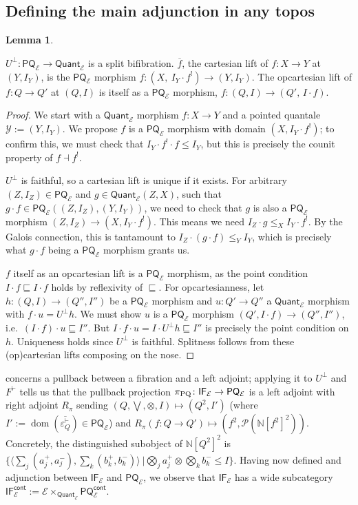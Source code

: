 \documentclass{article}
\makeatletter
\newcommand{\allproofs}{} %
\newif\ifproofsinappendix
\newcommand{\lemmawithproof}[3]{%
  \begin{lemma}\label{#1}
    #2  
    \ifproofsinappendix \hyperref[xxx#1]{(Proof)} \fi
  \end{lemma}
    \ifproofsinappendix
  \g@addto@macro\allproofs{%
    \par\medskip
    \noindent
    \subsection*{\cref{#1}}\par
    #2\par
    \begin{proof}\label{xxx#1}
      #3
    \end{proof}%
  }
      \else

    \begin{proof}
      #3
    \end{proof}
    \fi 
}
\theoremstyle{definition}
\newtheorem{lemma}{Lemma}[section]
\newcommand{\N}{\mathbb{N}}
\newcommand{\cE}{\mathcal{E}}
\newcommand{\cP}{\mathcal{P}}
\newcommand{\cY}{\mathcal{Y}}
\newcommand{\cat}[1]{\mathsf{#1}}
\newcommand{\dom}{\operatorname{dom}}
\makeatother
\begin{document}
\subsection{Defining the main adjunction in any topos}

\lemmawithproof{lemma:ubotfib}{
  $U^\bot\colon \cat{PQ}_\cE \to \cat{Quant}_\cE$ is a split bifibration. $\overline{f}$, the cartesian lift of $f\colon X\to Y$ at $(Y,I_Y)$, is the $\cat{PQ_\cE}$ morphism $f\colon (X,\ I_Y\cdot f^!)\to(Y,I_Y)$. The opcartesian lift of $f\colon Q\to Q'$ at $(Q,I)$ is itself as a $\cat{PQ_\cE}$ morphism, $f\colon(Q,I)\to(Q',\,I\cdot f)$.}
{
We start with a $\cat{Quant}_\cE$ morphism $f\colon X\to Y$ and a pointed quantale $\cY:=(Y, I_Y)$. 
We propose $f$ is a $\cat{PQ}_\cE$ morphism with domain $(X,I_Y\cdot f^!)$; 
to confirm this, we must check that $I_Y\cdot f^! \cdot f \leq I_Y$, but this is precisely the counit property of $f\dashv f^!$.
    
$U^\bot$ is faithful, so a cartesian lift is unique if it exists. 
For arbitrary $(Z,I_Z) \in \cat{PQ}_\cE$ and $g \in \cat{Quant}_\cE(Z, X)$, such that $g\cdot f \in \cat{PQ}_\cE((Z,I_Z),(Y,I_Y))$, we need to check that $g$ is also a $\cat{PQ}_\cE$ morphism $(Z,I_Z)\to (X,I_Y\cdot f^!)$. 
This means we need $I_Z\cdot g\leq_X I_Y \cdot f^!$. 
By the Galois connection, this is tantamount to $I_Z\cdot (g\cdot f) \leq_Y I_Y$, which is precisely what $g\cdot f$ being a $\cat{PQ}_\cE$ morphism grants us. 

$f$ itself as an opcartesian lift is a $\cat{PQ}_\cE$ morphism, as the point condition $I\cdot f\sqsubseteq I\cdot f$ holds by reflexivity of $\sqsubseteq$. 
For opcartesianness, let $h\colon(Q,I)\to(Q'',I'')$ be a $\cat{PQ}_\cE$ morphism and $u\colon Q'\to Q''$ a $\cat{Quant}_\cE$ morphism with $f\cdot u=U^\bot h$. 
We must show $u$ is a $\cat{PQ}_\cE$ morphism $(Q',I\cdot f)\to(Q'',I'')$, i.e.\ $(I\cdot f)\cdot u\sqsubseteq I''$. 
But $I\cdot f\cdot u=I\cdot U^\bot h\sqsubseteq I''$ is precisely the point condition on $h$. Uniqueness holds since $U^\bot$ is faithful. 
Splitness follows from these (op)cartesian lifts composing on the nose.
}

\cite[Lemma 2.1]{brown2026} concerns a pullback between a fibration and a left adjoint; 
applying it to $U^\bot$ and $F^\vdash$ tells us that the pullback projection $\pi_{\rm PQ}\colon \cat{IF_\cE\to PQ_\cE}$ is a left adjoint with right adjoint $R_\pi$ sending $(Q,\bigvee,\otimes,I)\mapsto (Q^2, I')$ (where $I':=\dom(\overline{\varepsilon^\vdash_Q})\in\cat{PQ_\cE}$) and $R_\pi(f\colon Q\to Q')\mapsto (f^2, \cP(\N[f^2]^2))$. 
Concretely, the distinguished subobject of $\N[Q^2]^2$ is $\big\{\langle\sum_j(a^+_j,a^-_j),\sum_k(b^+_k,b^-_k)\rangle \ \big|
\textstyle\bigotimes_j a^+_j\otimes\bigotimes_k b^-_k \leq I\big\}$.
Having now defined and adjunction between  $\cat{IF}_\cE$  and  $\cat{PQ}_\cE$, we observe that $\cat{IF}_\cE$ has a wide subcategory $\cat{IF_\cE^{cont}} := \cE \times_{\cat{Quant}_\cE} \cat{PQ_\cE^{cont}}$. 
\end{document}

